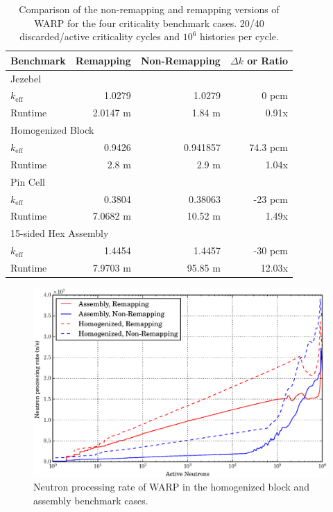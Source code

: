 \begin{table}[h]
\centering
\caption{Comparison of the non-remapping and remapping versions of WARP for the four criticality benchmark cases.  20/40 discarded/active criticality cycles and $10^6$ histories per cycle.}
\label{benchmark_nonremapping_summary}
\begin{tabular}{| l | r | r | r |}
 \hline
 Benchmark & Remapping  & Non-Remapping   & $\Delta k$ or Ratio  \\
\hline
\hline
\multicolumn{4}{|l|}{Jezebel}  \\
\hline
 $k_\mathrm{eff}$ & 1.0279 & 1.0279  & 0 pcm\\
 \hline
 Runtime               &   2.0147 m & 1.84 m & 0.91x \\
 \hline
 \hline
\multicolumn{4}{|l|}{Homogenized Block }\\
\hline
 $k_\mathrm{eff}$ & 0.9426 & 0.941857 & 74.3 pcm  \\
 \hline
 Runtime               &  2.8 m & 2.9 m & 1.04x \\
 \hline
  \hline
\multicolumn{4}{|l|}{Pin Cell}\\
\hline
 $k_\mathrm{eff}$ &  0.3804 & 0.38063  & -23 pcm \\
 \hline
 Runtime               & 7.0682 m & 10.52 m & 1.49x \\
 \hline
  \hline
\multicolumn{4}{|l|}{15-sided Hex Assembly}\\
\hline
 $k_\mathrm{eff}$  & 1.4454  & 1.4457 & -30 pcm \\
 \hline
 Runtime               & 7.9703 m & 95.85 m & 12.03x \\
 \hline
\end{tabular}
\end{table}

\begin{figure}[h!]
\centering
\includegraphics[width=\textwidth]{graphics/finalresults/process_rate.eps}
\caption{Neutron processing rate of WARP in the homogenized block and assembly benchmark cases. \label{process_rate} }
\end{figure}

